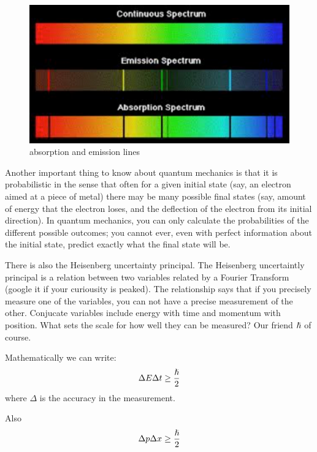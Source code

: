 \begin{figure}[h]
\centering\includegraphics[scale=0.5]{./ElementaryParticles/Pictures/fig6.pdf}
\caption{absorption and emission lines}
\label{fig:light}
\end{figure}


Another important thing to know about quantum mechanics is that it is probabilistic in the sense that often for a given initial state (say, an electron aimed at a piece of metal) there may be many possible final states (say, amount of energy that the electron loses, and the deflection of the electron from its initial direction).  In quantum mechanics, you can only calculate the probabilities of the different possible outcomes; you cannot ever, even with perfect information about the initial state, predict exactly what the final state will be.

There is also the Heisenberg uncertainty principal.  The Heisenberg uncertaintly principal is a relation between two variables related by a Fourier Transform (google it if your curiousity is peaked).  The relationship says that if you precisely measure one of the variables, you can not have a precise measurement of the other.   Conjucate variables include energy with time and momentum with position.  What sets the scale for how well they can be measured?  Our friend ${\rm \hslash}$ of course.

Mathematically we can write:
\begin{equation}
\Delta E \Delta t \ge {\hslash \over 2}
\end{equation} 
where $\Delta$ is the accuracy in the measurement.

Also
\begin{equation}
\Delta p \Delta x \ge {\hslash \over 2}
\end{equation} 


